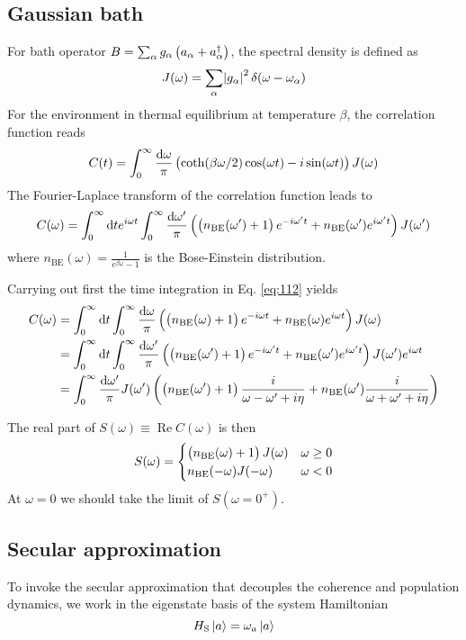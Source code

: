 \documentclass[a4paper,12pt]{book}
\newcommand{\eq}[1]{Eq. \eqref{#1}}
\newcommand{\be}{\begin{equation}}
\newcommand{\ee}{\end{equation}}
\renewcommand{\Re}{\operatorname{Re}}
\begin{document}
\subsection{Gaussian bath}
For bath operator $B = \sum_\alpha g_\alpha \del{a_\alpha + a_\alpha^\dag}$, the spectral density is defined as
\be
J(\omega) = \sum_\alpha \abs{g_\alpha}^2 \delta(\omega - \omega_\alpha)
\ee
For the environment in thermal equilibrium at temperature $\beta$, the correlation function reads
\be
C(t) = \int_0^\infty \frac{\dif \omega}{\pi}\del{\coth(\beta \omega/2) \cos(\omega t) - i \sin(\omega t)} J(\omega)
\ee
The Fourier-Laplace transform of the correlation function leads to
\be
C(\omega) = \int_0^\infty \dif t e^{i\omega t} \int_0^\infty \frac{\dif \omega'}{\pi}\del{ \del{n_\text{BE}(\omega') + 1}e^{-i\omega' t} + n_\text{BE}(\omega') e^{i\omega' t} } J(\omega')
\label{eq:112}
\ee
where $n_\text{BE}(\omega) = \frac{1}{e^{\beta \omega} - 1}$ is the Bose-Einstein distribution.

Carrying  out  first the time integration in \eq{eq:112}  yields
\be
\begin{split}
C(\omega) &= \int_0^\infty \dif t \int_0^\infty \frac{\dif \omega}{\pi}\del{ \del{n_\text{BE}(\omega) + 1}e^{-i\omega t} + n_\text{BE}(\omega) e^{i\omega t} } J(\omega) \\
&= \int_0^\infty \dif t \int_0^\infty \frac{\dif \omega'}{\pi}\del{ \del{n_\text{BE}(\omega') + 1} e^{-i\omega' t} + n_\text{BE}(\omega') e^{i\omega' t} } J(\omega') e^{i\omega t} \\
&=  \int_0^\infty \frac{\dif \omega'}{\pi} J(\omega') \del{ \del{n_\text{BE}(\omega') + 1} \frac{i}{\omega - \omega' + i \eta}  + n_\text{BE}(\omega')   \frac{i}{\omega + \omega' + i \eta} }
\end{split}
\ee

The real part of $S(\omega) \equiv \Re C(\omega)$ is then
\be
S(\omega) =
\begin{cases}
  \del{n_\text{BE}(\omega) + 1} J(\omega)    & \omega \ge 0 \\
  n_\text{BE}(-\omega)  J(-\omega)    & \omega < 0
\end{cases}
\ee
At $\omega = 0$ we should take the limit of $S(\omega = 0^+)$.

\subsection{Secular approximation}
To invoke the secular approximation that decouples the coherence and population dynamics, we work in the eigenstate basis of the system Hamiltonian \be H_\text{S}\ket{a} = \omega_a \ket{a} \ee
\end{document}
